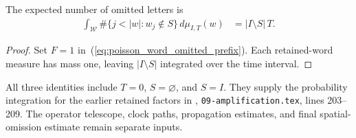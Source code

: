\begin{corollary}
\label{cor:poisson_word_omitted_count}
\leanok
{}
The expected number of omitted letters is
\begin{align}
 \int_{\mathcal W}\#\{j<|w|:w_j\notin S\}\,d\mu_{I,T}(w)
 &=|I\setminus S|\,T.
 \label{eq:poisson_word_omitted_count}
\end{align}
\end{corollary}
\begin{proof}
\leanok
{}
Set $F=1$ in~(\ref{eq:poisson_word_omitted_prefix}).
Each retained-word measure has mass one, leaving $|I\setminus S|$
integrated over the time interval.
\end{proof}

All three identities include $T=0$, $S=\varnothing$, and $S=I$.
They supply the probability integration for the earlier retained factors
in \cite{OpenAI2026AreaLaw}, \texttt{09-amplification.tex}, lines 203--209.
The operator telescope, clock paths, propagation estimates, and final
spatial-omission estimate remain separate inputs.
